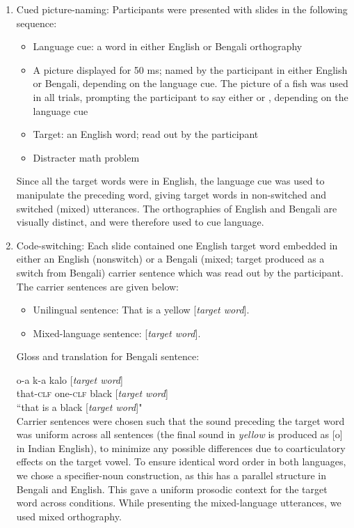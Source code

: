 \documentclass[12 pt]{article}
\newcommand{\nt}[1]{\textipa{[#1]}} %
\begin{document}
\begin{enumerate}[]
	\item Cued picture-naming: Participants were presented with slides in the following sequence:
	\begin{itemize}
		\item Language cue: a word in either English or Bengali orthography
		\item A picture displayed for 50 ms; named by the participant in either English or Bengali, depending on the language cue. The picture of a fish was used in all trials, prompting the participant to say either \nt{fIS} or \nt{ma: \textteshlig \super{h}}, depending on the language cue
		\item Target: an English word; read out by the participant
		\item Distracter math problem
	\end{itemize}
	Since all the target words were in English, the language cue was used to manipulate the preceding word, giving target words in non-switched and switched (mixed) utterances. The orthographies of English and Bengali are visually distinct, and were therefore used to cue language.
	
	\item Code-switching: Each slide contained one English target word embedded in either an English (nonswitch) or a Bengali (mixed; target produced as a switch from Bengali) carrier sentence which was read out by the participant. The carrier sentences are given below:
	\begin{itemize}
		\item Unilingual sentence: That is a yellow [\textit{target word}].
		\item Mixed-language sentence:  [\textit{target word}]. 
	\end{itemize}
	
Gloss and translation for Bengali sentence:

o-a \qquad \textipa{\ae}k-a \quad kalo [\textit{target word}]\\
that-\textsc{clf}  one-\textsc{clf}  black [\textit{target word}]\\
``that is a black [\textit{target word}]"\\
	
Carrier sentences were chosen such that the sound preceding the target word was uniform across all sentences (the final sound in \textit{yellow} is produced as [o] in Indian English), to minimize any possible differences due to coarticulatory effects on the target vowel. To ensure identical word order in both languages, we chose a specifier-noun construction, as this has a parallel structure in Bengali and English. This gave a uniform prosodic context for the target word across conditions. While presenting the mixed-language utterances, we used mixed orthography. \\
	
\end{enumerate}
\end{document}
